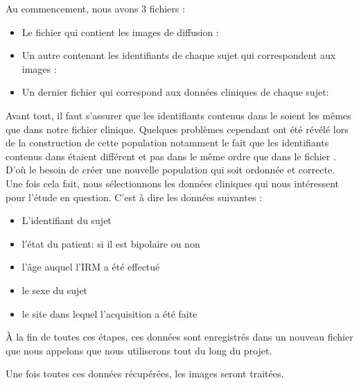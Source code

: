Au commencement, nous avons 3 fichiers :
\begin{itemize}
	\item Le fichier qui contient les images de diffusion : 
	\item Un autre contenant les identifiants de chaque sujet qui correspondent aux images : 
	\item Un dernier fichier qui correspond aux données cliniques de chaque sujet:  
\end{itemize}

Avant tout, il faut s'assurer que les identifiants contenus dans le  soient les mêmes que dans notre fichier clinique.
Quelques problèmes cependant ont été révélé lors de la construction de cette population notamment le fait que les identifiants contenus dans  étaient différent et pas dans le même ordre que dans le fichier .
D'où le besoin de créer une nouvelle population qui soit ordonnée et correcte. 
Une fois cela fait, nous sélectionnons les données cliniques qui nous intéressent pour l'étude en question. C'est à dire les données suivantes : 
\begin{itemize}
	\item L'identifiant du sujet
	\item l'état du patient: si il est bipolaire ou non
	\item l'âge auquel l'IRM a été effectué
	\item le sexe du sujet
	\item le site dans lequel l'acquisition a été faite 
\end{itemize}

À la fin de toutes ces étapes, ces données sont enregistrés dans un nouveau fichier que nous appelons  que nous utiliserons tout du long du projet.


Une fois toutes ces données récupérées, les images seront traitées. 
